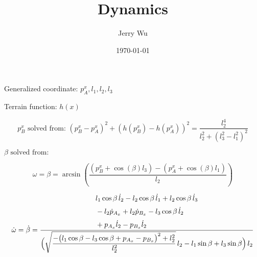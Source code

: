 \documentclass[10pt]{article}
\title{\textbf{Dynamics}}
\author{Jerry Wu}
\date{\today}
\begin{document}
\maketitle

\noindent
Generalized coordinate: \(p_A^x, l_1, l_2, l_3\)

\vspace{0.5em}

Terrain function: \(h(x)\)

\vspace{1em}

\[
p_B^x \text{ solved from: } (p_B^x - p_A^x)^2 + (h(p_B^x) - h(p_A^x))^2 = \frac{l_2^4}{l_2^2 + (l_3^2 - l_1^2)^2}
\]

\vspace{1em}

\(\beta \text{ solved from: } \)

\[
\omega = \beta = \arcsin\left( \frac{(p_B^x + \cos(\beta) l_3) - (p_A^x + \cos(\beta) l_1)}{l_2} \right)
\]

\vspace{1em}

\[
\dot{\omega} = \dot{\beta} =
\frac{%
\begin{aligned}
 &l_{1}\cos\beta\,\dot l_{2}
 - l_{2}\cos\beta\,\dot l_{1}
 + l_{2}\cos\beta\,\dot l_{3} \\[2pt]
 &- l_{2}\dot p_{A_x}
 + l_{2}\dot p_{B_x}
 - l_{3}\cos\beta\,\dot l_{2} \\[2pt]
 &+ p_{A_x}\dot l_{2}
 - p_{B_x}\dot l_{2}
\end{aligned}}%
{\Bigl(
  \sqrt{\dfrac{-
    \bigl(l_{1}\cos\beta - l_{3}\cos\beta + p_{A_x} - p_{B_x}\bigr)^{2}
    + l_{2}^{2}}{\,l_{2}^{2}}}\,l_{2}
  - l_{1}\sin\beta
  + l_{3}\sin\beta
  \Bigr)\,l_{2}}
\]

\vspace{1em}
\end{document}
